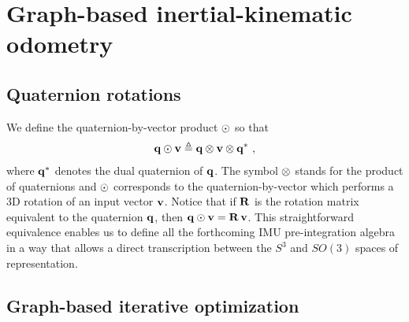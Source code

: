 
\section{Graph-based inertial-kinematic odometry}




\subsection{Quaternion rotations}

We define the quaternion-by-vector product $\odot$ so that
%
\begin{align}
{\bf q}\odot{\bf v} \triangleq {\bf q}\otimes{\bf v}\otimes{\bf q}^*
~,
\end{align}
%
where ${\bf q}^*$ denotes the dual quaternion of ${\bf q}$. 
The symbol $\otimes$ stands for the product of quaternions and $\odot$ corresponds to the quaternion-by-vector which performs a 3D rotation of an input vector ${\bf v}$. 
Notice that if ${\bf R}$ is the rotation matrix equivalent to the quaternion ${\bf q}$, then 
%
${\bf q}\odot{\bf v} = {\bf R}\,{\bf v}$. 
%
This straightforward equivalence
enables us to define all the forthcoming IMU pre-integration algebra in a way that allows a direct transcription between the $S^3$  and $SO(3)$ spaces of representation.

\subsection{Graph-based iterative optimization}

